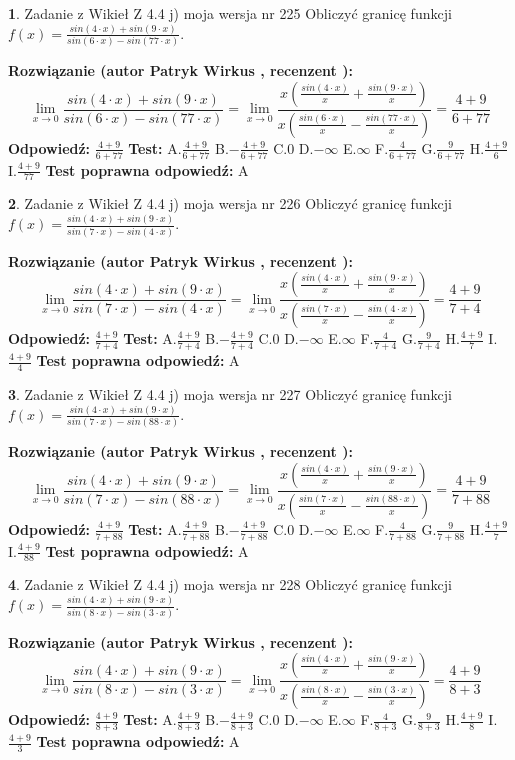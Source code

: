 \documentclass[12pt, a4paper]{article}
\theoremstyle{definition} %
\newtheorem{zad}{}
\newcommand{\zadStart}[1]{\begin{zad}#1\newline}
\newcommand{\zadStop}{\end{zad}}
\newcommand{\rozwStart}[2]{\noindent \textbf{Rozwiązanie (autor #1 , recenzent #2): }\newline}
\newcommand{\rozwStop}{\newline}
\newcommand{\odpStart}{\noindent \textbf{Odpowiedź:}\newline}
\newcommand{\odpStop}{\newline}
\newcommand{\testStart}{\noindent \textbf{Test:}\newline}
\newcommand{\testStop}{\newline}
\newcommand{\kluczStart}{\noindent \textbf{Test poprawna odpowiedź:}\newline}
\newcommand{\kluczStop}{\newline}
\begin{document}
\zadStart{Zadanie z Wikieł Z 4.4 j) moja wersja nr 225}
Obliczyć granicę funkcji $f(x)=\frac{sin(4\cdot x) +sin(9\cdot x)}{sin(6\cdot x) -sin(77\cdot x)}$.
\zadStop
\rozwStart{Patryk Wirkus}{}
$$\lim\limits_{x\to 0}\frac{sin(4\cdot x) +sin(9\cdot x)}{sin(6\cdot x) -sin(77\cdot x)}=\lim\limits_{x\to 0}\frac{x(\frac{sin(4\cdot x)}{x}+\frac{sin(9\cdot x)}{x})}{x(\frac{sin(6\cdot x)}{x}-\frac{sin(77\cdot x)}{x})}=\frac{4+9}{6+77}$$
\rozwStop
\odpStart
$\frac{4+9}{6+77}$
\odpStop
\testStart
A.$\frac{4+9}{6+77}$
B.$-\frac{4+9}{6+77}$
C.$0$
D.$-\infty$
E.$\infty$
F.$\frac{4}{6+77}$
G.$\frac{9}{6+77}$
H.$\frac{4+9}{6}$
I.$\frac{4+9}{77}$
\testStop
\kluczStart
A
\kluczStop



\zadStart{Zadanie z Wikieł Z 4.4 j) moja wersja nr 226}
Obliczyć granicę funkcji $f(x)=\frac{sin(4\cdot x) +sin(9\cdot x)}{sin(7\cdot x) -sin(4\cdot x)}$.
\zadStop
\rozwStart{Patryk Wirkus}{}
$$\lim\limits_{x\to 0}\frac{sin(4\cdot x) +sin(9\cdot x)}{sin(7\cdot x) -sin(4\cdot x)}=\lim\limits_{x\to 0}\frac{x(\frac{sin(4\cdot x)}{x}+\frac{sin(9\cdot x)}{x})}{x(\frac{sin(7\cdot x)}{x}-\frac{sin(4\cdot x)}{x})}=\frac{4+9}{7+4}$$
\rozwStop
\odpStart
$\frac{4+9}{7+4}$
\odpStop
\testStart
A.$\frac{4+9}{7+4}$
B.$-\frac{4+9}{7+4}$
C.$0$
D.$-\infty$
E.$\infty$
F.$\frac{4}{7+4}$
G.$\frac{9}{7+4}$
H.$\frac{4+9}{7}$
I.$\frac{4+9}{4}$
\testStop
\kluczStart
A
\kluczStop



\zadStart{Zadanie z Wikieł Z 4.4 j) moja wersja nr 227}
Obliczyć granicę funkcji $f(x)=\frac{sin(4\cdot x) +sin(9\cdot x)}{sin(7\cdot x) -sin(88\cdot x)}$.
\zadStop
\rozwStart{Patryk Wirkus}{}
$$\lim\limits_{x\to 0}\frac{sin(4\cdot x) +sin(9\cdot x)}{sin(7\cdot x) -sin(88\cdot x)}=\lim\limits_{x\to 0}\frac{x(\frac{sin(4\cdot x)}{x}+\frac{sin(9\cdot x)}{x})}{x(\frac{sin(7\cdot x)}{x}-\frac{sin(88\cdot x)}{x})}=\frac{4+9}{7+88}$$
\rozwStop
\odpStart
$\frac{4+9}{7+88}$
\odpStop
\testStart
A.$\frac{4+9}{7+88}$
B.$-\frac{4+9}{7+88}$
C.$0$
D.$-\infty$
E.$\infty$
F.$\frac{4}{7+88}$
G.$\frac{9}{7+88}$
H.$\frac{4+9}{7}$
I.$\frac{4+9}{88}$
\testStop
\kluczStart
A
\kluczStop



\zadStart{Zadanie z Wikieł Z 4.4 j) moja wersja nr 228}
Obliczyć granicę funkcji $f(x)=\frac{sin(4\cdot x) +sin(9\cdot x)}{sin(8\cdot x) -sin(3\cdot x)}$.
\zadStop
\rozwStart{Patryk Wirkus}{}
$$\lim\limits_{x\to 0}\frac{sin(4\cdot x) +sin(9\cdot x)}{sin(8\cdot x) -sin(3\cdot x)}=\lim\limits_{x\to 0}\frac{x(\frac{sin(4\cdot x)}{x}+\frac{sin(9\cdot x)}{x})}{x(\frac{sin(8\cdot x)}{x}-\frac{sin(3\cdot x)}{x})}=\frac{4+9}{8+3}$$
\rozwStop
\odpStart
$\frac{4+9}{8+3}$
\odpStop
\testStart
A.$\frac{4+9}{8+3}$
B.$-\frac{4+9}{8+3}$
C.$0$
D.$-\infty$
E.$\infty$
F.$\frac{4}{8+3}$
G.$\frac{9}{8+3}$
H.$\frac{4+9}{8}$
I.$\frac{4+9}{3}$
\testStop
\kluczStart
A
\kluczStop
\end{document}
